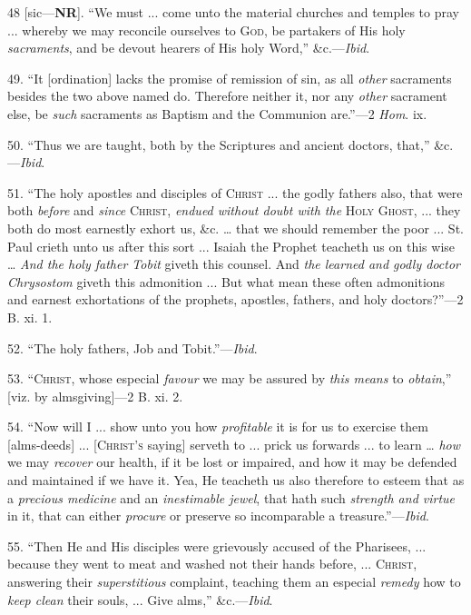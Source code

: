 48 [sic—\textbf{NR}]. ``We must ... come unto the material churches and temples
to pray ... whereby we may reconcile ourselves to G\textsc{od},
be partakers of His holy \emph{sacraments}, and be devout hearers of
His holy Word,'' \&c.—\emph{Ibid}.

49. ``It [ordination] lacks the promise of remission of sin, as
all \emph{other} sacraments besides the two above named do. Therefore
neither it, nor any \emph{other} sacrament else, be \emph{such}
sacraments as Baptism and the Communion are.''—2 \emph{Hom}. ix.

50. ``Thus we are taught, both by the Scriptures and ancient
doctors, that,'' \&c.—\emph{Ibid}.

51. ``The holy apostles and disciples of C\textsc{hrist}
... the godly fathers also, that were both \emph{before} and \emph{since}
C\textsc{hrist}, \emph{endued without doubt with the}
H\textsc{oly} G\textsc{host}, ... they both
do most earnestly exhort us, \&c. … that we should remember the
poor ... St. Paul crieth unto us after this sort ... Isaiah the
Prophet teacheth us on this wise … \emph{And the holy father Tobit}
giveth this counsel. And \emph{the learned and godly doctor Chrysostom}
giveth this admonition ... But what mean these often admonitions and
earnest exhortations of the prophets, apostles, fathers, and holy
doctors?''—2 B. xi. 1.

52. ``The holy fathers, Job and Tobit.''—\emph{Ibid}.

53. ``C\textsc{hrist}, whose especial \emph{favour}
we may be assured by \emph{this means} to \emph{obtain},'' [viz.
by almsgiving]—2 B. xi. 2.

54. ``Now will I ... show unto you how \emph{profitable} it is
for us to exercise them [alms-deeds] ... [C\textsc{hrist's}
saying] serveth to ... prick us forwards ... to learn … \emph{how}
we may \emph{recover} our health, if it be lost or impaired, and how
it may be defended and maintained if we have it. Yea, He teacheth us
also therefore to esteem that as a \emph{precious medicine} and an \emph{inestimable
jewel}, that hath such \emph{strength and virtue} in it, that can
either \emph{procure} or preserve so incomparable a treasure.''—\emph{Ibid}.

55. ``Then He and His disciples were grievously accused of the
Pharisees, ... because they went to meat and washed not their hands
before, ... C\textsc{hrist}, answering their \emph{superstitious}
complaint, teaching them an especial \emph{remedy} how to \emph{keep
clean} their souls, ... Give alms,'' \&c.—\emph{Ibid}.

